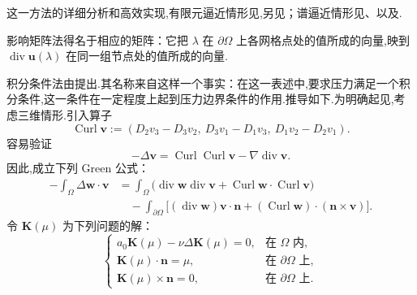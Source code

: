 这一方法的详细分析和高效实现,有限元逼近情形见,另见；谱逼近情形见、以及.

影响矩阵法得名于相应的矩阵：它把 \(\lambda\) 在 \(\partial\Omega\) 上各网格点处的值所成的向量,映到 \(\operatorname{div}\boldsymbol{u}(\lambda)\) 在同一组节点处的值所成的向量.

积分条件法由提出.其名称来自这样一个事实：在这一表述中,要求压力满足一个积分条件,这一条件在一定程度上起到压力边界条件的作用.推导如下.为明确起见,考虑三维情形.引入算子
\begin{equation}\label{eq:9.6.30}
  \operatorname{Curl}\boldsymbol{v}
     :=(D_2v_3-D_3v_2,\ D_3v_1-D_1v_3,\ D_1v_2-D_2v_1).
\end{equation}
容易验证
\[
  -\Delta\boldsymbol{v}=\operatorname{Curl}\operatorname{Curl}\boldsymbol{v}
                     -\nabla\operatorname{div}\boldsymbol{v}.
\]
因此,成立下列 Green 公式：
\begin{equation}\label{eq:9.6.31}
  \begin{aligned}
    -\int_\Omega\Delta\boldsymbol{w}\cdot\boldsymbol{v}
      &=\int_\Omega\bigl(\operatorname{div}\boldsymbol{w}\operatorname{div}\boldsymbol{v}
                        +\operatorname{Curl}\boldsymbol{w}\cdot\operatorname{Curl}\boldsymbol{v}\bigr)\\
      &\quad-\int_{\partial\Omega}\bigl[(\operatorname{div}\boldsymbol{w})\boldsymbol{v}\cdot\boldsymbol{n}
                 +(\operatorname{Curl}\boldsymbol{w})\cdot(\boldsymbol{n}\times\boldsymbol{v})\bigr].
  \end{aligned}
\end{equation}
令 \(\boldsymbol{K}(\mu)\) 为下列问题的解：
\begin{equation}\label{eq:9.6.32}
  \begin{cases}
    a_0\boldsymbol{K}(\mu)-\nu\Delta\boldsymbol{K}(\mu)=0,&\text{在 }\Omega\text{ 内},\\
    \boldsymbol{K}(\mu)\cdot\boldsymbol{n}=\mu,&\text{在 }\partial\Omega\text{ 上},\\
    \boldsymbol{K}(\mu)\times\boldsymbol{n}=0,&\text{在 }\partial\Omega\text{ 上}.
  \end{cases}
\end{equation}
